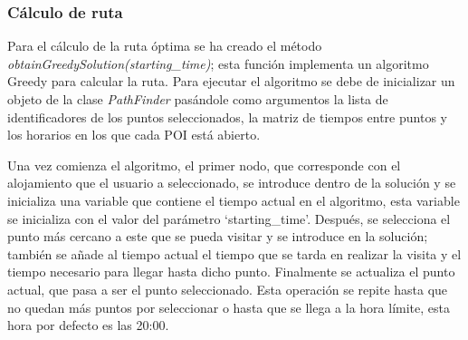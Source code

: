 \subsubsection{Cálculo de ruta}
Para el cálculo de la ruta óptima se ha creado el método \textit{obtainGreedySolution(starting\_time)}; esta función implementa un algoritmo Greedy para calcular la ruta. Para ejecutar el algoritmo se debe de inicializar un objeto de la clase \textit{PathFinder} pasándole como argumentos la lista de identificadores de los puntos seleccionados, la matriz de tiempos entre puntos y los horarios en los que cada POI está abierto.\newline

Una vez comienza el algoritmo, el primer nodo, que corresponde con el alojamiento que el usuario a seleccionado, se introduce dentro de la solución y se inicializa una variable que contiene el tiempo actual en el algoritmo, esta variable se inicializa con el valor del parámetro \enquote*{starting\_time}. Después, se selecciona el punto más cercano a este que se pueda visitar y se introduce en la solución; también se añade al tiempo actual el tiempo que se tarda en realizar la visita y el tiempo necesario para llegar hasta dicho punto. Finalmente se actualiza el punto actual, que pasa a ser el punto seleccionado. Esta operación se repite hasta que no quedan más puntos por seleccionar o hasta que se llega a la hora límite, esta hora por defecto es las 20:00.\newline

